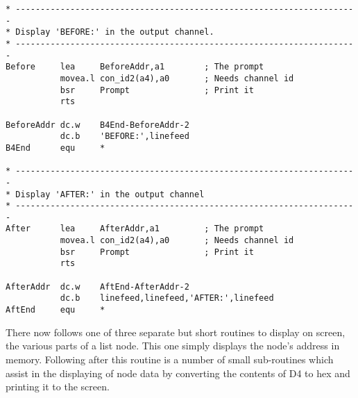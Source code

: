 \begin{lstlisting}[firstnumber=last,caption={Single Linked List - Demo Code - Show Before and After States}]
* ---------------------------------------------------------------------
* Display 'BEFORE:' in the output channel.
* ---------------------------------------------------------------------
Before     lea     BeforeAddr,a1        ; The prompt
           movea.l con_id2(a4),a0       ; Needs channel id
           bsr     Prompt               ; Print it
           rts

BeforeAddr dc.w    B4End-BeforeAddr-2
           dc.b    'BEFORE:',linefeed
B4End      equ     *

* ---------------------------------------------------------------------
* Display 'AFTER:' in the output channel
* ---------------------------------------------------------------------
After      lea     AfterAddr,a1         ; The prompt
           movea.l con_id2(a4),a0       ; Needs channel id
           bsr     Prompt               ; Print it
           rts

AfterAddr  dc.w    AftEnd-AfterAddr-2
           dc.b    linefeed,linefeed,'AFTER:',linefeed
AftEnd     equ     *
\end{lstlisting}

There now follows one of three separate but short routines to
    display on screen, the various parts of a list node. This one simply
    displays the node's address in memory. Following after this routine is a
    number of small sub-{}routines which assist in the displaying of node data
    by converting the contents of D4 to hex and printing it to the
    screen.

